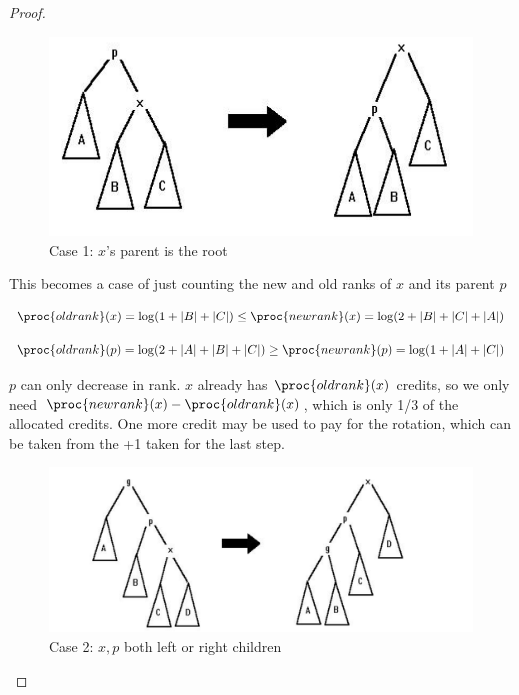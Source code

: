 \documentclass[../notes.tex]{subfiles}
\begin{document}
\begin{proof}
	\begin{figure}[H]
		\centering
		\includegraphics[width=0.8\linewidth]{img/image_2022-11-25-22-19-09.png}
		\caption{Case 1: $ x $'s parent is the root}
	\end{figure}

	This becomes a case of just counting the new and old ranks of $ x $ and its parent $ p $



	\begin{equation}
		\proc{old rank}(x) = \log (1 + |B| + |C|) \le  \proc{new rank}(x) = \log (2 + |B| + |C| + |A|)
	\end{equation}

	\begin{equation}
		\proc{old rank}(p) = \log (2 + |A| + |B| + |C|) \ge  \proc{new rank}(p) = \log (1 + |A| + |C|)
	\end{equation}

	$ p $ can only decrease in rank. $ x $ already has $ \proc{old rank}(x) $ credits, so we only need $ \proc{new rank}(x) - \proc{old rank}(x) $, which is  only 1/3 of the allocated credits. One more credit may be used to pay for the rotation, which can be taken from the +1 taken for the last step.



	
	
	\begin{figure}[H]
		\centering
		\includegraphics[width=0.8\linewidth]{img/image_2022-11-25-23-34-53.png}
		\caption{Case 2: $ x, p $ both left or right children}
	\end{figure}


\end{proof}
\end{document}
